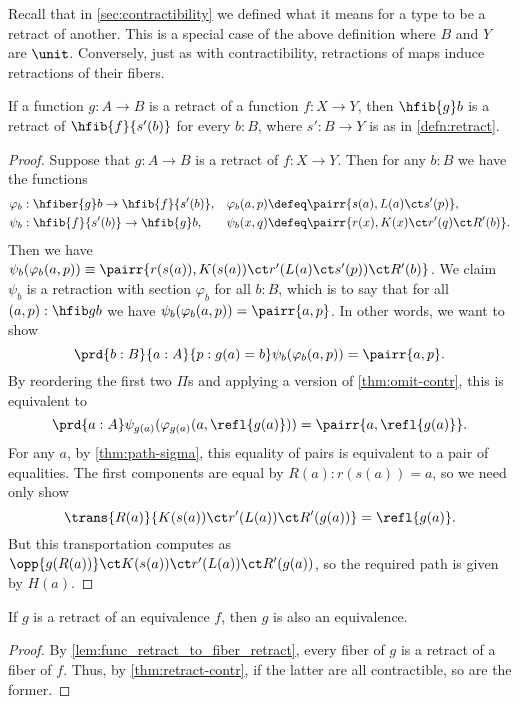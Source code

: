 Recall that in \cref{sec:contractibility} we defined what it means for a type to be a retract of another.
This is a special case of the above definition where $B$ and $Y$ are $\unit$.
Conversely, just as with contractibility, retractions of maps induce retractions of their fibers.

\begin{lem}\label{lem:func_retract_to_fiber_retract}
If a function $g:A\to B$ is a retract of a function $f:X\to Y$, then $\hfib{g}b$ is a retract of $\hfib{f}{s'(b)}$
for every $b:B$, where $s':B\to Y$ is as in \cref{defn:retract}.
\end{lem}

\begin{proof}
Suppose that $g:A\to B$ is a retract of $f:X\to Y$. Then for any $b:B$ we have the functions
\begin{align*}
\varphi_b &:\hfiber{g}b\to\hfib{f}{s'(b)}, &
\varphi_b(a,p) & \defeq \pairr{s(a),L(a)\ct s'(p)},\\
\psi_b &:\hfib{f}{s'(b)}\to\hfib{g}b, &
\psi_b(x,q) &\defeq \pairr{r(x),K(x)\ct r'(q)\ct R'(b)}.
\end{align*}
Then we have $\psi_b(\varphi_b({a,p}))\equiv\pairr{r(s(a)),K(s(a))\ct r'(L(a)\ct s'(p))\ct R'(b)}$.
We claim $\psi_b$ is a retraction with section $\varphi_b$ for all $b:B$, which is to say that for all $(a,p):\hfib g b$ we have $\psi_b(\varphi_b({a,p}))= \pairr{a,p}$.
In other words, we want to show
\begin{equation*}
\prd{b:B}{a:A}{p:g(a)=b} \psi_b(\varphi_b({a,p}))= \pairr{a,p}.
\end{equation*}
By reordering the first two $\Pi$s and applying a version of \cref{thm:omit-contr}, this is equivalent to
\begin{equation*}
\prd{a:A}\psi_{g(a)}(\varphi_{g(a)}({a,\refl{g(a)}}))=\pairr{a,\refl{g(a)}}.
\end{equation*}
For any $a$, by \cref{thm:path-sigma}, this equality of pairs is equivalent to a pair of equalities. The first components are equal by $R(a):r(s(a))= a$, so we need only show
\begin{equation*}
\trans{R(a)}{K(s(a))\ct r'(L(a))\ct R'(g(a))} = \refl{g(a)}.
\end{equation*}
But this transportation computes as $\opp{g(R(a))}\ct K(s(a))\ct r'(L(a))\ct R'(g(a))$, so the required path is given by $H(a)$.
\end{proof}

\begin{thm}\label{thm:retract-equiv}
  If $g$ is a retract of an equivalence $f$, then $g$ is also an equivalence.
\end{thm}
\begin{proof}
  By \cref{lem:func_retract_to_fiber_retract}, every fiber of $g$ is a retract of a fiber of $f$.
  Thus, by \cref{thm:retract-contr}, if the latter are all contractible, so are the former.
\end{proof}

